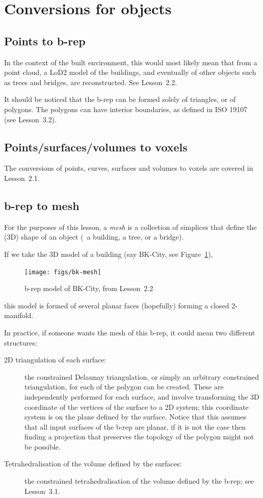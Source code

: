%
\section{Conversions for objects}


\subsection{Points to b-rep}

In the context of the built environment, this would most likely mean that from a point cloud, a LoD2 model of the buildings, and eventually of other objects such as trees and bridges, are reconstructed. See Lesson~2.2.

It should be noticed that the b-rep can be formed solely of triangles, or of polygons.
The polygons can have interior boundaries, as defined in ISO 19107 (see Lesson~3.2).

\subsection{Points/surfaces/volumes to voxels}

The conversions of points, curves, surfaces and volumes to voxels are covered in Lesson~2.1.


\subsection{b-rep to mesh}

For the purposes of this lesson, a \emph{mesh} is a collection of simplices that define the (3D) shape of an object (\eg\ a building, a tree, or a bridge).

If we take the 3D model of a building (say BK-City, see Figure~\ref{fig:bk-mesh}), 
\begin{figure}
  \centering
  \texttt{[image: figs/bk-mesh]}
  \caption{b-rep model of BK-City, from Lesson~2.2}%
\label{fig:bk-mesh}
\end{figure}
this model is formed of several planar faces (hopefully) forming a closed 2-manifold.

In practice, if someone wants the mesh of this b-rep, it could mean two different structures:
\begin{description}
  \item[2D triangulation of each surface:] the constrained Delaunay triangulation, or simply an arbitrary constrained triangulation, for each of the polygon can be created. These are independently performed for each surface, and involve transforming the 3D coordinate of the vertices of the surface to a 2D system; this coordinate system is on the plane defined by the surface. Notice that this assumes that all input surfaces of the b-rep are planar, if it is not the case then finding a projection that preserves the topology of the polygon might not be possible.
  \item[Tetrahedralisation of the volume defined by the surfaces:] the constrained tetrahedralisation of the volume defined by the b-rep; see Lesson~3.1.
\end{description}

